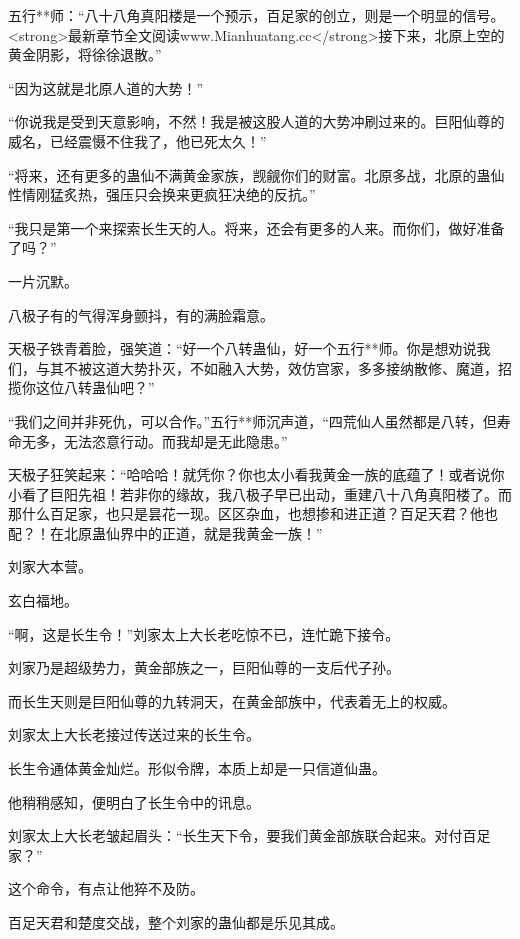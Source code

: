 
\begin{this_body}

五行**师：“八十八角真阳楼是一个预示，百足家的创立，则是一个明显的信号。<strong>最新章节全文阅读www.Mianhuatang.cc</strong>接下来，北原上空的黄金阴影，将徐徐退散。”

“因为这就是北原人道的大势！”

“你说我是受到天意影响，不然！我是被这股人道的大势冲刷过来的。巨阳仙尊的威名，已经震慑不住我了，他已死太久！”

“将来，还有更多的蛊仙不满黄金家族，觊觎你们的财富。北原多战，北原的蛊仙性情刚猛炙热，强压只会换来更疯狂决绝的反抗。”

“我只是第一个来探索长生天的人。将来，还会有更多的人来。而你们，做好准备了吗？”

一片沉默。

八极子有的气得浑身颤抖，有的满脸霜意。

天极子铁青着脸，强笑道：“好一个八转蛊仙，好一个五行**师。你是想劝说我们，与其不被这道大势扑灭，不如融入大势，效仿宫家，多多接纳散修、魔道，招揽你这位八转蛊仙吧？”

“我们之间并非死仇，可以合作。”五行**师沉声道，“四荒仙人虽然都是八转，但寿命无多，无法恣意行动。而我却是无此隐患。”

天极子狂笑起来：“哈哈哈！就凭你？你也太小看我黄金一族的底蕴了！或者说你小看了巨阳先祖！若非你的缘故，我八极子早已出动，重建八十八角真阳楼了。而那什么百足家，也只是昙花一现。区区杂血，也想掺和进正道？百足天君？他也配？！在北原蛊仙界中的正道，就是我黄金一族！”

刘家大本营。

玄白福地。

“啊，这是长生令！”刘家太上大长老吃惊不已，连忙跪下接令。

刘家乃是超级势力，黄金部族之一，巨阳仙尊的一支后代子孙。

而长生天则是巨阳仙尊的九转洞天，在黄金部族中，代表着无上的权威。

刘家太上大长老接过传送过来的长生令。

长生令通体黄金灿烂。形似令牌，本质上却是一只信道仙蛊。

他稍稍感知，便明白了长生令中的讯息。

刘家太上大长老皱起眉头：“长生天下令，要我们黄金部族联合起来。对付百足家？”

这个命令，有点让他猝不及防。

百足天君和楚度交战，整个刘家的蛊仙都是乐见其成。


\end{this_body}
